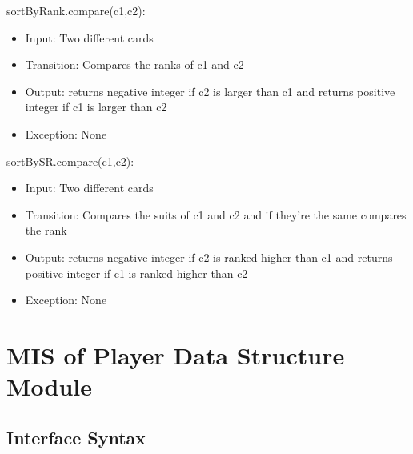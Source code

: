 \documentclass[12pt, titlepage]{article}
\begin{document}
\noindent sortByRank.compare(c1,c2):
\begin{itemize}
    \item Input: Two different cards
    \item Transition: Compares the ranks of c1 and c2
    \item Output: returns negative integer if c2 is larger than c1 and returns positive integer if c1 is larger than c2
    \item Exception: None
\end{itemize}

\noindent sortBySR.compare(c1,c2):
\begin{itemize}
    \item Input: Two different cards
    \item Transition: Compares the suits of c1 and c2 and if they're the same compares the rank
    \item Output: returns negative integer if c2 is ranked higher than c1 and returns positive integer if c1 is ranked higher than c2
    \item Exception: None
\end{itemize}

\section{MIS of Player Data Structure Module}

\subsection{Interface Syntax}
\end{document}
